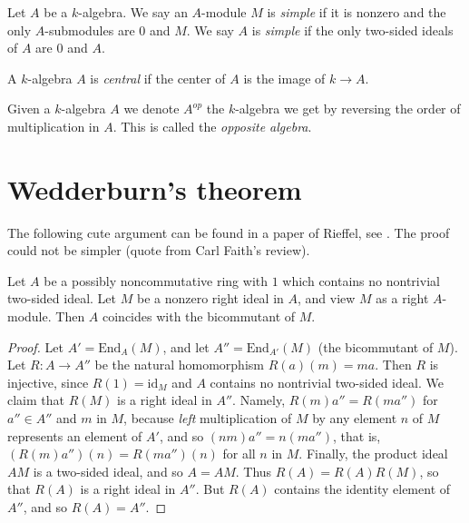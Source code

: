\begin{definition}
\label{definition-simple}
Let $A$ be a $k$-algebra.
We say an $A$-module $M$ is {\it simple} if it is nonzero and
the only $A$-submodules are $0$ and $M$.
We say $A$ is {\it simple} if the only two-sided ideals of $A$ are
$0$ and $A$.
\end{definition}

\begin{definition}
\label{definition-central}
A $k$-algebra $A$ is {\it central} if the center of $A$ is the image of
$k \to A$.
\end{definition}

\begin{definition}
\label{definition-opposite}
Given a $k$-algebra $A$ we denote $A^{op}$ the $k$-algebra we get by
reversing the order of multiplication in $A$. This is called the
{\it opposite algebra}.
\end{definition}




\section{Wedderburn's theorem}
\label{section-wedderburn}

\noindent
The following cute argument can be found in a paper of Rieffel, see
\cite{Rieffel}. The proof could not be simpler (quote from
Carl Faith's review).

\begin{lemma}
\label{lemma-rieffel}
Let $A$ be a possibly noncommutative ring with $1$ which contains no
nontrivial two-sided ideal. Let $M$ be a nonzero right ideal in $A$,
and view $M$ as a right $A$-module. Then $A$ coincides with the
bicommutant of $M$.
\end{lemma}

\begin{proof}
Let $A' = \text{End}_A(M)$, and let $A'' = \text{End}_{A'}(M)$
(the bicommutant of $M$). Let $R : A \to A''$ be the natural homomorphism
$R(a)(m) = ma$. Then $R$ is injective, since $R(1) = \text{id}_M$
and $A$ contains no nontrivial two-sided ideal. We claim that $R(M)$
is a right ideal in $A''$. Namely, $R(m)a'' = R(ma'')$ for $a'' \in A''$
and $m$ in $M$, because {\it left} multiplication of $M$ by any element $n$
of $M$ represents an element of $A'$, and so
$(nm)a'' = n(ma'')$, that is, $(R(m)a'') (n) = R(ma'') (n)$ for all
$n$ in $M$. Finally, the product ideal $AM$ is a two-sided ideal, and so
$A = AM$. Thus $R(A) = R(A)R(M)$, so that $R(A)$ is a right ideal in $A''$.
But $R(A)$ contains the identity element of $A''$, and so $R(A) = A''$.
\end{proof}

